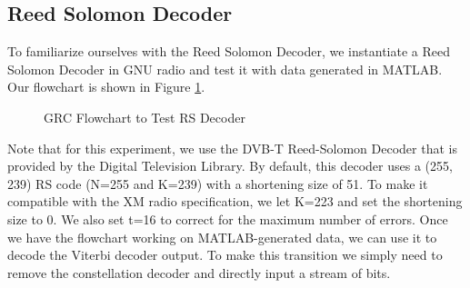 \documentclass[conference,onecolumn]{IEEEtran}
\begin{document}

\subsection{Reed Solomon Decoder}

To familiarize ourselves with the Reed Solomon Decoder, we instantiate a Reed Solomon Decoder in GNU radio and test it with data generated in MATLAB. Our flowchart is shown in Figure \ref{fig::rs_test_grc}. 

\begin{figure}[H]
	\centerline{}
	\caption{GRC Flowchart to Test RS Decoder}
	\label{fig::rs_test_grc}
\end{figure}

	Note that for this experiment, we use the DVB-T Reed-Solomon Decoder that is provided by the  Digital Television Library. By default, this decoder uses a (255, 239) RS code (N=255 and K=239) with a shortening size of 51. To make it compatible with the XM radio specification, we let K=223 and set the shortening size to 0. We also set t=16 to correct for the maximum number of errors. Once we have the flowchart working on MATLAB-generated data, we can use it to decode the Viterbi decoder output. To make this transition we simply need to remove the constellation decoder and directly input a stream of bits.
\end{document}
